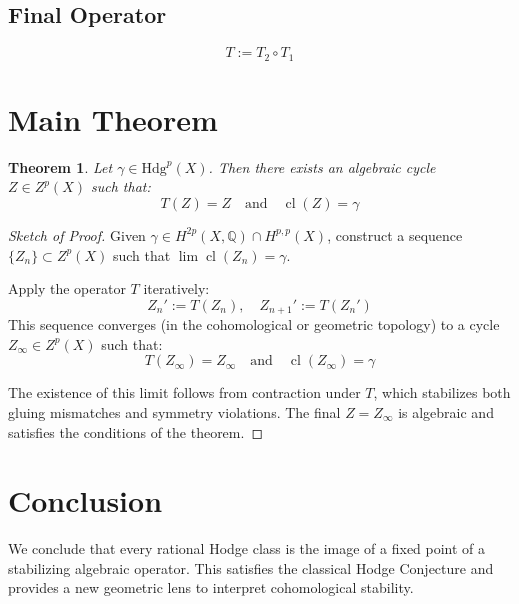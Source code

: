 \documentclass[12pt]{article}
\begin{document}
\subsection*{Final Operator}
\[
T := T_2 \circ T_1
\]

\section{Main Theorem}
\newtheorem{theorem}{Theorem}
\begin{theorem}
Let \( \gamma \in \text{Hdg}^p(X) \). Then there exists an algebraic cycle \( Z \in Z^p(X) \) such that:
\[
T(Z) = Z \quad \text{and} \quad \operatorname{cl}(Z) = \gamma
\]
\end{theorem}

\begin{proof}[Sketch of Proof]
Given \( \gamma \in H^{2p}(X, \mathbb{Q}) \cap H^{p,p}(X) \), construct a sequence \( \{Z_n\} \subset Z^p(X) \) such that \( \lim \operatorname{cl}(Z_n) = \gamma \).

Apply the operator \( T \) iteratively:
\[
Z_n' := T(Z_n), \quad Z_{n+1}' := T(Z_n')
\]
This sequence converges (in the cohomological or geometric topology) to a cycle \( Z_\infty \in Z^p(X) \) such that:
\[
T(Z_\infty) = Z_\infty \quad \text{and} \quad \operatorname{cl}(Z_\infty) = \gamma
\]

The existence of this limit follows from contraction under \( T \), which stabilizes both gluing mismatches and symmetry violations. The final \( Z = Z_\infty \) is algebraic and satisfies the conditions of the theorem.
\end{proof}

\section{Conclusion}
We conclude that every rational Hodge class is the image of a fixed point of a stabilizing algebraic operator. This satisfies the classical Hodge Conjecture and provides a new geometric lens to interpret cohomological stability.
\end{document}
